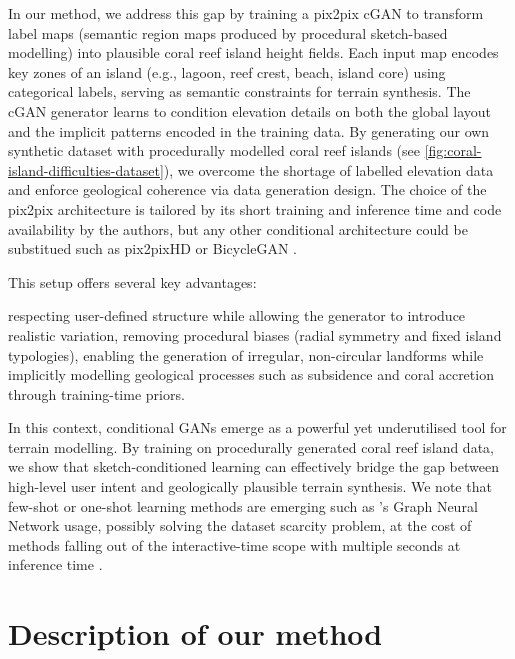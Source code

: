\midConclusion

In our method, we address this gap by training a pix2pix cGAN to transform label maps (semantic region maps produced by procedural sketch-based modelling) into plausible coral reef island height fields. Each input map encodes key zones of an island (e.g., lagoon, reef crest, beach, island core) using categorical labels, serving as semantic constraints for terrain synthesis. The cGAN generator learns to condition elevation details on both the global layout and the implicit patterns encoded in the training data. By generating our own synthetic dataset with procedurally modelled coral reef islands (see \cref{fig:coral-island-difficulties-dataset}), we overcome the shortage of labelled elevation data and enforce geological coherence via data generation design. The choice of the pix2pix architecture is tailored by its short training and inference time and code availability by the authors, but any other conditional architecture could be substitued such as pix2pixHD or BicycleGAN \cite{Wang2018,Zhu2018NN}.

This setup offers several key advantages: 
\begin{Itemize}
    \Item{} respecting user-defined structure while allowing the generator to introduce realistic variation,
    \Item{} removing procedural biases (radial symmetry and fixed island typologies),
    \Item{} enabling the generation of irregular, non-circular landforms while implicitly modelling geological processes such as subsidence and coral accretion through training-time priors.
\end{Itemize}


\bigConclusion

In this context, conditional GANs emerge as a powerful yet underutilised tool for terrain modelling. By training on procedurally generated coral reef island data, we show that sketch-conditioned learning can effectively bridge the gap between high-level user intent and geologically plausible terrain synthesis. We note that few-shot or one-shot learning methods are emerging such as 's Graph Neural Network usage, possibly solving the dataset scarcity problem, at the cost of methods falling out of the interactive-time scope with multiple seconds at inference time \cite{Liu2025}.




\section{Description of our method}
\label{sec:coral-island-method-description}

